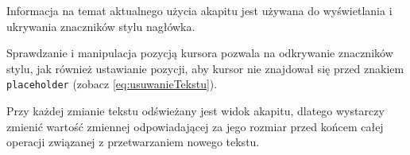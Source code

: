Informacja na temat aktualnego użycia akapitu jest używana do wyświetlania i ukrywania znaczników stylu nagłówka.

Sprawdzanie i manipulacja pozycją kursora pozwala na odkrywanie znaczników stylu, jak również ustawianie pozycji, aby kursor nie znajdował się przed znakiem \verb|placeholder| (zobacz \ref{eq:usuwanieTekstu}).

Przy każdej zmianie tekstu odświeżany jest widok akapitu, dlatego wystarczy zmienić wartość zmiennej odpowiadającej za jego rozmiar przed końcem całej operacji związanej z przetwarzaniem nowego tekstu.
